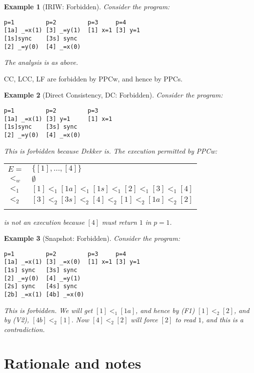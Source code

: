 \documentclass[10pt]{article}
\newtheorem{example}{Example}[section]
\begin{document}
\begin{example}[IRIW: Forbidden]
Consider the program:
\begin{verbatim}
p=1         p=2         p=3     p=4
[1a] _=x(1) [3] _=y(1)  [1] x=1 [3] y=1
[1s]sync    [3s] sync
[2] _=y(0)  [4] _=x(0)
\end{verbatim}

The analysis is as above.
\end{example}

CC, LCC, LF are forbidden by PPCw, and hence by PPCs. 

\begin{example}[Direct Consistency, DC: Forbidden]
Consider the program:
\begin{verbatim}
p=1         p=2         p=3     
[1a] _=x(1) [3] y=1     [1] x=1 
[1s]sync    [3s] sync
[2] _=y(0)  [4] _=x(0)
\end{verbatim}

This is forbidden  because Dekker is. The execution permitted by PPCw:

\begin{tabular}[t]{ll}
  $E=$ & $\{[1],\ldots, [4]\}$ \\
  $<_w$ & $\emptyset$\\
  $<_1$ & $[1] <_1 [1a] <_1 [1s] <_1 [2] <_1 [3] <_1 [4]$\\{}
  $<_2$ & $[3] <_2 [3s] <_2 [4] <_2 [1] <_2 [1a] <_2 [2]$\\{}
\end{tabular}

is not an execution because $[4]$ must return $1$ in $p=1$.
\end{example}

\begin{example}[Snapshot: Forbidden]
Consider the program:
\begin{verbatim}
p=1         p=2         p=3     p=4
[1a] _=x(1) [3] _=x(0)  [1] x=1 [3] y=1
[1s] sync   [3s] sync
[2] _=y(0)  [4] _=y(1)
[2s] sync   [4s] sync
[2b] _=x(1) [4b] _=x(0)
\end{verbatim}

This is forbidden. We will get $[1] <_1 [1a]$, and hence by (F1) $[1]
<_2 [2]$, and by (V2), $[4b] <_2 [1]$. Now $[4] <_2 [2]$ will 
force $[2]$ to read $1$, and this is a contradiction.
\end{example}

{\footnotesize   }

\appendix
\section{Rationale and notes}
\end{document}
